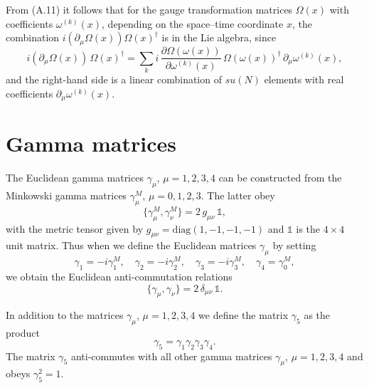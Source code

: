 From (A.11) it follows that for the gauge transformation matrices $\Omega(x)$
with coefficients $\omega^{(k)}(x)$, depending on the space--time coordinate
$x$, the combination $i(\partial_\mu\Omega(x))\Omega(x)^\dagger$ is in the Lie
algebra, since
\begin{equation}
  i(\partial_\mu\Omega(x))\,\Omega(x)^\dagger
  = \sum_k i\,\frac{\partial\Omega(\omega(x))}{\partial\omega^{(k)}(x)}\,
  \Omega(\omega(x))^\dagger\,\partial_\mu\omega^{(k)}(x),
\end{equation}
and the right-hand side is a linear combination of $su(N)$ elements with real
coefficients $\partial_\mu\omega^{(k)}(x)$.

\section{Gamma matrices}

The Euclidean gamma matrices $\gamma_\mu$, $\mu = 1, 2, 3, 4$ can be
constructed from the Minkowski gamma matrices $\gamma_\mu^M$, $\mu = 0, 1, 2,
3$. The latter obey
\begin{equation}
  \{\gamma_\mu^M, \gamma_\nu^M\} = 2\,g_{\mu\nu}\,\mathbb{1},
\end{equation}
with the metric tensor given by $g_{\mu\nu} = \mathrm{diag}(1,-1,-1,-1)$ and
$\mathbb{1}$ is the $4\times 4$ unit matrix. Thus when we define the Euclidean
matrices $\gamma_\mu$ by setting
\begin{equation}
  \gamma_1 = -i\gamma_1^M,\quad
  \gamma_2 = -i\gamma_2^M,\quad
  \gamma_3 = -i\gamma_3^M,\quad
  \gamma_4 = \gamma_0^M,
\end{equation}
we obtain the Euclidean anti-commutation relations
\begin{equation}
  \{\gamma_\mu, \gamma_\nu\} = 2\,\delta_{\mu\nu}\,\mathbb{1}.
\end{equation}

In addition to the matrices $\gamma_\mu$, $\mu = 1, 2, 3, 4$ we define the
matrix $\gamma_5$ as the product
\begin{equation}
  \gamma_5 = \gamma_1\gamma_2\gamma_3\gamma_4 .
\end{equation}
The matrix $\gamma_5$ anti-commutes with all other gamma matrices $\gamma_\mu$,
$\mu = 1, 2, 3, 4$ and obeys $\gamma_5^2 = 1$.


